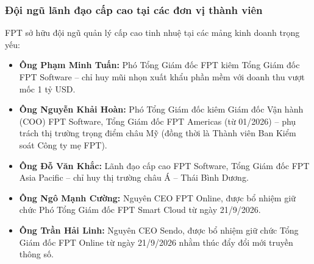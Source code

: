 \subsubsection{Đội ngũ lãnh đạo cấp cao tại các đơn vị thành viên}
FPT sở hữu đội ngũ quản lý cấp cao tinh nhuệ tại các mảng kinh doanh trọng yếu:
\begin{itemize}
    \item \textbf{Ông Phạm Minh Tuấn:} Phó Tổng Giám đốc FPT kiêm Tổng Giám đốc FPT Software -- chỉ huy mũi nhọn xuất khẩu phần mềm với doanh thu vượt mốc 1 tỷ USD.
    \item \textbf{Ông Nguyễn Khải Hoàn:} Phó Tổng Giám đốc kiêm Giám đốc Vận hành (COO) FPT Software, Tổng Giám đốc FPT Americas (từ 01/2026) -- phụ trách thị trường trọng điểm châu Mỹ (đồng thời là Thành viên Ban Kiểm soát Công ty mẹ FPT).
    \item \textbf{Ông Đỗ Văn Khắc:} Lãnh đạo cấp cao FPT Software, Tổng Giám đốc FPT Asia Pacific -- chỉ huy thị trường châu Á -- Thái Bình Dương.
    \item \textbf{Ông Ngô Mạnh Cường:} Nguyên CEO FPT Online, được bổ nhiệm giữ chức Phó Tổng Giám đốc FPT Smart Cloud từ ngày 21/9/2026.
    \item \textbf{Ông Trần Hải Linh:} Nguyên CEO Sendo, được bổ nhiệm giữ chức Tổng Giám đốc FPT Online từ ngày 21/9/2026 nhằm thúc đẩy đổi mới truyền thông số.
\end{itemize}

